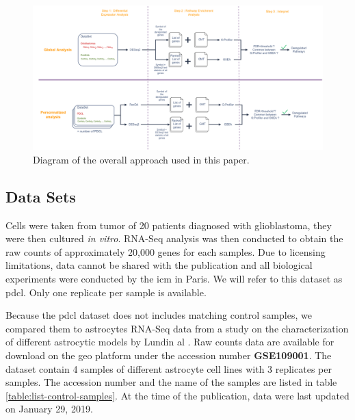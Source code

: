 \begin{figure}
    \centering
    \includegraphics[width=\textwidth]{img/workflow-diagram.png}
    \caption{
        Diagram of the overall approach used in this paper.
    }
    \label{fig:workflow-diagram}
\end{figure}

\subsection{Data Sets}

Cells were taken from tumor of 20 patients diagnosed with glioblastoma, they were  then cultured \textit{in vitro}.
RNA-Seq analysis was then conducted to obtain the raw counts of approximately 20,000 genes for each samples.
Due to licensing limitations, data cannot be shared with the publication and all biological experiments were conducted by the \acrfull{icm} in Paris.
We will refer to this dataset as \acrfull{pdcl}.
Only one replicate per sample is available.

Because the \acrshort{pdcl} dataset does not includes matching control samples, we compared them to astrocytes RNA-Seq data from a study on the characterization of different astrocytic models by Lundin  al \cite*{Lundin2018}.
Raw counts data are available for download on the \acrfull{geo} platform under the accession number \textbf{GSE109001}.
The dataset contain 4 samples of different astrocyte cell lines with 3 replicates per samples.
The accession number and the name of the samples are listed in table \ref*{table:list-control-samples}.
At the time of the publication, data were last updated on January 29, 2019.

